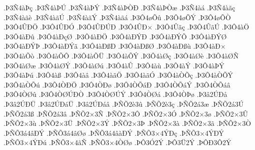 {.^^de3^^d14^^e0^^de^^e7
.^^de3^^d14^^e0^^de^^da
.^^de3^^d14^^e0^^de^^dd
.^^de3^^d14^^e0^^de^^d2^^d0
.^^de3^^d14^^e0^^de^^d2^^e6
.^^de3^^d14^^e0^^e1
.^^de3^^d14^^e0^^e3^^e7
.^^de3^^d14^^e0^^e3^^e8
.^^de3^^d14^^e0^^e3^^da
.^^de3^^d14^^e0^^e3^^dd
.^^de3^^d14^^e0^^e3^^e1
.^^de3^^d44^^f8^^d5^^fb
.^^de3^^d44^^f8^^d5^^dd
.^^de3^^d44^^f8^^d5^^d2
.^^de3^^d44^^db^^d0^^d6
.^^de3^^d44^^db^^d0^^d3
.^^de3^^d44^^db^^d0^^da^^d0
.^^de3^^d44^^db^^d0^^d7
.^^de3^^d44^^db^^e3^^e7
.^^de3^^d44^^db^^e3^^da
.^^de3^^d44^^e0^^d6
.^^de3^^d44^^e0^^d0^^fb
.^^de3^^d44^^e0^^d0^^e7^^d8
.^^de3^^d44^^e0^^d0^^d6
.^^de3^^d44^^e0^^d0^^dd^^d0
.^^de3^^d44^^e0^^d0^^dd^^d5
.^^de3^^d44^^e0^^d0^^dd^^d8
.^^de3^^d44^^e0^^d0^^dd^^de
.^^de3^^d44^^e0^^d0^^dd^^e3
.^^de3^^d44^^e0^^d0^^df^^d0
.^^de3^^d44^^e0^^d0^^df^^d8
.^^de3^^d44^^e0^^d0^^df^^f9
.^^de3^^d44^^e0^^d0^^d7
.^^de3^^d44^^e0^^d5^^f2
.^^de3^^d44^^e0^^d5^^d4
.^^de3^^d44^^e0^^d5^^dc
.^^de3^^d44^^e0^^d5^^dd
.^^de3^^d44^^e0^^d8^^e7
.^^de3^^d44^^e0^^d8^^e8
.^^de3^^d44^^e0^^d8^^d1
.^^de3^^d44^^e0^^d8^^e6
.^^de3^^d44^^e0^^d8^^dd
.^^de3^^d44^^e0^^d8^^fa
.^^de3^^d44^^e0^^db
.^^de3^^d44^^e0^^f9
.^^de3^^d44^^e0^^dd
.^^de3^^d44^^e0^^de^^dd
.^^de3^^d44^^e0^^de^^fa
.^^de3^^d44^^e0^^df
.^^de3^^d44^^e0^^e2
.^^de3^^d44^^e0^^e3^^d6
.^^de3^^d44^^e0^^e3^^d3
.^^de3^^d44^^e0^^d2^^d5^^e7
.^^de3^^d44^^e0^^d2^^d5^^dd
.^^de3^^d44^^e0^^d2^^d5^^fa
.^^de3^^d44^^d2^^d0^^d6
.^^de3^^d44^^d2^^d0^^f8
.^^de3^^d44^^d2^^d5^^e1^^d0
.^^de3^^d44^^d2^^d5^^e1^^dd
.^^de3^^d44^^d2^^d5^^e1^^e2
.^^de3^^d44^^d2^^d8^^fb
.^^de3^^d44^^d2^^d8^^da^^d0^^d2
.^^de3^^d44^^d2^^d8^^da^^dd
.^^de3^^d44^^d2^^d8^^e1
.^^de3^^d44^^d2^^de^^f8
.^^de3^^e22^^da^^d0^^e5
.^^de3^^e22^^da^^d0^^dc
.^^de3^^e22^^da^^d0^^e1^^dc
.^^de3^^e22^^da^^d0^^e1^^e2
.^^de^^d1^^d52^^e83^^fb
.^^de^^d1^^d52^^e83^^e7
.^^de^^d1^^d52^^e13^^e6
.^^de^^d1^^d52^^e13^^da
.^^de^^d1^^d52^^e13^^df
.^^de^^d1^^d52^^e13^^e2
.^^de^^d1^^d52^^d73^^d1
.^^de^^d1^^d52^^d73^^d4
.^^de^^d1^^d52^^d73^^d3
.^^de^^d1^^d52^^d73^^f8
.^^de^^d1^^d52^^d73^^db
.^^de^^d1^^d52^^d73^^f9
.^^de^^d1^^d52^^d73^^dc
.^^de^^d1^^d52^^d73^^dd
.^^de^^d1^^d52^^d73^^de
.^^de^^d1^^d52^^d73^^e0
.^^de^^d1^^d52^^d73^^e3
.^^de^^d1^^d52^^d73^^d2
.^^de^^d1^^d53^^e14^^e2^^d0^^dd
.^^de^^d1^^d53^^e14^^e2^^d8^^f8
.^^de^^d1^^d53^^e14^^e2^^e0^^d0^^dd
.^^de^^d1^^d53^^d74^^dd^^d0^^e7
.^^de^^d1^^d53^^d74^^dd^^d0^^dd
.^^de^^d1^^d53^^d74^^dd^^d0^^fa
.^^de^^d1^^d53^^d74^^e3^^d1
.^^de^^d1^^d53^^d74^^d2^^d8^^f8
.^^de^^d43^^d32^^dd
.^^de^^d43^^dc2^^dd
.^^de^^d4^^d03^^d42^^dd
}
